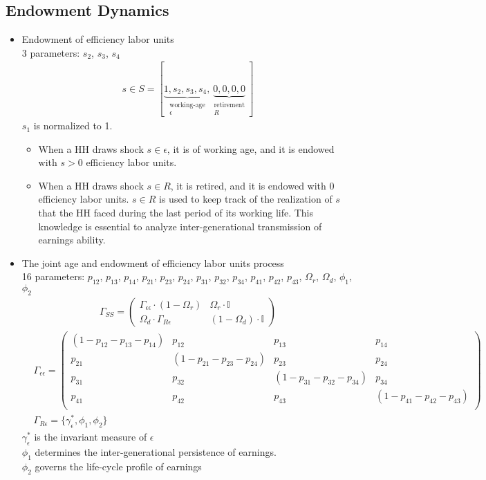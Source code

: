 \documentclass{article}
\begin{document}
\begin{spacing}{1.5}
\subsection{Endowment Dynamics}
\begin{itemize}
\item Endowment of efficiency labor units\\
3 parameters: $s_2$, $s_3$, $s_4$
\begin{align*}
s\in S=[\underbrace{1, s_2, s_3, s_4,}_{\substack{\text{working-age}\\ \epsilon}} \underbrace{0, 0, 0, 0}_{\substack{\text{retirement}\\ R}}]
\end{align*}
$s_1$ is normalized to 1. 
\begin{itemize}
\item When a HH draws shock $s\in \epsilon$, it is of working age, and it is endowed with $s>0$ efficiency labor units.
\item When a HH draws shock $s\in R$, it is retired, and it is endowed with 0 efficiency labor units. $s\in R$ is used to keep track of the realization of $s$ that the HH faced during the last period of its working life. This knowledge is essential to analyze inter-generational transmission of earnings ability.
\end{itemize}
\newpage
\item The joint age and endowment of efficiency labor units process\\
16 parameters: $p_{12}$, $p_{13}$, $p_{14}$, $p_{21}$, $p_{23}$, $p_{24}$, $p_{31}$, $p_{32}$, $p_{34}$, $p_{41}$, $p_{42}$, $p_{43}$, $\Omega_r$, $\Omega_d$, $\phi_1$, $\phi_2$
\begin{align*}
\Gamma_{SS}=
\begin{pmatrix}
\Gamma_{\epsilon\epsilon}\cdot(1-\Omega_r) & \Omega_r\cdot\mathbb{I}\\
\Omega_d\cdot\Gamma_{R\epsilon} & (1-\Omega_d)\cdot\mathbb{I} 
\end{pmatrix}
\end{align*}
\begin{align*}
&\Gamma_{\epsilon\epsilon}=
\begin{pmatrix}
         (1-p_{12}-p_{13}-p_{14}) & p_{12} & p_{13}& p_{14}\\
         p_{21} & (1-p_{21}-p_{23}-p_{24}) & p_{23}& p_{24}\\
         p_{31} & p_{32} & (1-p_{31}-p_{32}-p_{34})& p_{34}\\
         p_{41} & p_{42} & p_{43} & (1-p_{41}-p_{42}-p_{43})\\
\end{pmatrix}
\\
&\Gamma_{R\epsilon} = \big\{\gamma^*_{\epsilon}, \phi_1, \phi_2\big\}
\end{align*}
$\gamma^*_{\epsilon}$ is the invariant measure of $\epsilon$\\
$\phi_1$ determines the inter-generational persistence of earnings.\\
$\phi_2$ governs the life-cycle profile of earnings\\
\end{itemize}



\end{spacing}
\end{document}
